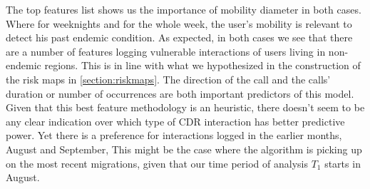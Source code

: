 \begin{table}[ht]
    \centering
    \caption{A representation of the top features that resulted from the Random Forest experiment on \cref{target4}. }\label{tab:random_forest_big_experiment_best_features}
\end{table}


The top features list shows us the importance of mobility diameter in both cases.
Where for weeknights and for the whole week, the user's mobility is  relevant to detect his past endemic condition.
As expected, in both cases we see that there are a number of features logging vulnerable interactions of users living in non-endemic regions.
This is in line with what we hypothesized in the construction of the risk maps in \cref{section:riskmaps}.
The direction of the call and the calls' duration or number of occurrences are both important predictors of this model.
Given that this best feature methodology is an heuristic, there doesn't seem to be any clear indication over which type of CDR interaction has better predictive power.
Yet there is a preference for interactions logged in the earlier months, August and September,
This might be the case where the algorithm is picking up on the most recent migrations, given that our time period of analysis $T_1$ starts in August.

